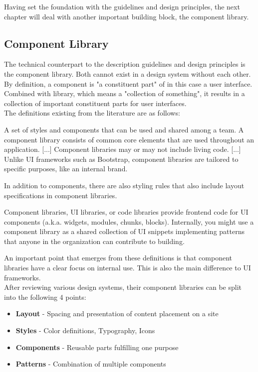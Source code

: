 Having set the foundation with the guidelines and design principles, the next chapter will deal with another important building block, the component library.
\subsection{Component Library}
The technical counterpart to the description guidelines and design principles is the component library. Both cannot exist in a design system without each other.  By definition, a component is "a constituent part" \cite{component_definition} of in this case a user interface.  Combined with library, which means a "collection of something"\cite{library_definition}, it results in a collection of important constituent parts for user interfaces.  \\
The definitions existing from the literature are as follows:
\begin{tcolorbox}[title=Definition of component library by \citet*{vesselov_building_2019}]
A set of styles and components that can be used and shared among a team. A component library consists of common core elements that are used throughout an application. [...] Component libraries may or may not include living code. [...] Unlike UI frameworks such as Bootstrap, component libraries are tailored to specific purposes, like an internal brand.
\end{tcolorbox}
In addition to components, there are also styling rules that also include layout specifications in component libraries. 
\begin{tcolorbox}[title=Definition of component library by \citet*{macdonald_practical_2019}]
Component libraries, UI libraries, or code libraries provide frontend code for UI components (a.k.a. widgets, modules, chunks, blocks). Internally, you might use a component library as a shared collection of UI snippets implementing patterns that anyone in the organization can contribute to building.
\end{tcolorbox}
An important point that emerges from these definitions is that component libraries have a clear focus on internal use. This is also the main difference to UI frameworks. \\
After reviewing various design systems, their component libraries can be split into the following 4 points:
\begin{itemize}
	\item \textbf{Layout} - Spacing and presentation of content placement on a site
	\item \textbf{Styles} - Color definitions, Typography, Icons
	\item \textbf{Components} - Reusable parts fulfilling one purpose
	\item \textbf{Patterns} - Combination of multiple components 
\end{itemize}


